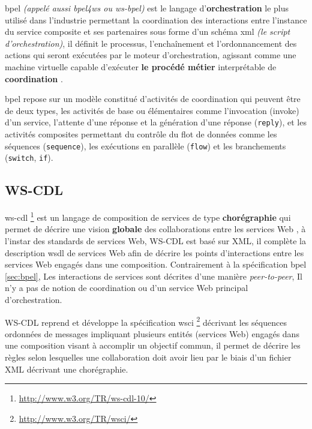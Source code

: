  \acrshort{bpel} \textit{(appelé aussi \acrshort{bpel4ws} ou
    \acrshort{ws-bpel})} est le langage d'\textbf{orchestration} le
  plus utilisé dans l'industrie permettant la coordination des
  interactions entre l'instance du service composite et ses
  partenaires sous forme d'un schéma \acrshort{xml} \textit{(le script
    d'orchestration)}, il définit le processus, l'enchaînement et
  l'ordonnancement des actions qui seront exécutées par le moteur
  d'orchestration, agissant comme une machine virtuelle capable
  d'exécuter \textbf{le procédé métier} interprétable de
  \textbf{coordination} \cite{chollet2009orchestration}.\medskip

  \acrshort{bpel} repose sur un modèle constitué d'activités de
  coordination qui peuvent être de deux types, les activités de base
  ou élémentaires comme l'invocation (invoke) d'un service, l'attente
  d'une réponse et la génération d'une réponse (\verb|reply|), et les
  activités composites permettant du contrôle du flot de données comme
  les séquences (\verb|sequence|), les exécutions en parallèle
  (\verb|flow|) et les branchements (\verb|switch|, \verb|if|).

  \subsection{WS-CDL}
  \label{sec:WS-CDL}
  \acrshort{ws-cdl} \footnote{\url{http://www.w3.org/TR/ws-cdl-10/}}
  \cite{kavantzas2005web} est un langage de composition de services de
  type \textbf{chorégraphie} qui permet de décrire une vision
  \textbf{globale} des collaborations entre les services Web
  \cite{elie2010}, à l'instar des standards de services Web,
  \textsc{WS-CDL} est basé sur \textsc{XML}, il complète la
  description \acrshort{wsdl} de services Web afin de décrire les
  points d'interactions entre les services Web engagés dans une
  composition. Contrairement à la spécification \acrshort{bpel}
  \ref{sec:bpel}, Les interactions de services sont décrites d'une
  manière \textit{peer-to-peer}, Il n'y a pas de notion de
  coordination ou d'un service Web principal d'orchestration.\medskip

  \textsc{WS-CDL} reprend et développe la spécification
  \acrshort{wsci} \footnote{\url{http://www.w3.org/TR/wsci/}}
  \cite{arkin2002web} décrivant les séquences ordonnées de messages
  impliquant plusieurs entités (services Web) engagés dans une
  composition visant à accomplir un objectif commun, il permet de
  décrire les règles selon lesquelles une collaboration doit avoir
  lieu par le biais d'un fichier \textsc{XML} décrivant une
  chorégraphie.


